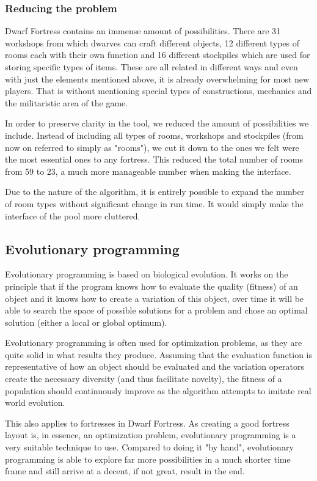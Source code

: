 \subsubsection{Reducing the problem}
\label{02_DF_Reducing}
Dwarf Fortress contains an immense amount of possibilities. There are 31 workshops\cite{dfwiki:Workshops} from which dwarves can craft different objects, 12 different types of rooms\cite{dfwiki:Rooms} each with their own function and 16 different stockpiles\cite{dfwiki:Stockpiles} which are used for storing specific types of items. These are all related in different ways and even with just the elements mentioned above, it is already overwhelming for most new players. That is without mentioning special types of constructions, mechanics and the militaristic area of the game.

In order to preserve clarity in the tool, we reduced the amount of possibilities we include. Instead of including all types of rooms, workshops and stockpiles (from now on referred to simply as "rooms"), we cut it down to the ones we felt were the most essential ones to any fortress. This reduced the total number of rooms from 59 to 23, a much more manageable number when making the interface.

Due to the nature of the algorithm, it is entirely possible to expand the number of room types without significant change in run time. It would simply make the interface of the pool more cluttered.

\subsection{Evolutionary programming}
\label{02_Evolution}
Evolutionary programming\cite[Chapter 2]{IoEC} is based on biological evolution. It works on the principle that if the program knows how to evaluate the quality (fitness) of an object and it knows how to create a variation of this object, over time it will be able to search the space of possible solutions for a problem and chose an optimal solution (either a local or global optimum).

Evolutionary programming is often used for optimization problems, as they are quite solid in what results they produce. Assuming that the evaluation function is representative of how an object should be evaluated and the variation operators create the necessary diversity (and thus facilitate novelty), the fitness of a population should continuously improve as the algorithm attempts to imitate real world evolution.

This also applies to fortresses in Dwarf Fortress. As creating a good fortress layout is, in essence, an optimization problem, evolutionary programming is a very suitable technique to use. Compared to doing it "by hand", evolutionary programming is able to explore far more possibilities in a much shorter time frame and still arrive at a decent, if not great, result in the end.